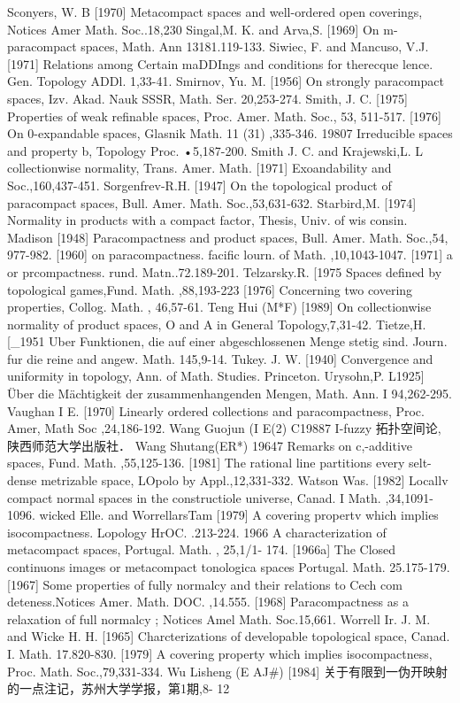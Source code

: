 \documentclass[main.tex]{subfiles}
\begin{document}
{Sconyers, W. B
[1970]
Metacompact spaces and well-ordered open coverings, Notices Amer
Math. Soc..18,230
Singal,M. K. and Arva,S.
[1969]
On m-paracompact spaces, Math. Ann
13181.119-133.
Siwiec, F. and Mancuso, V.J.
[1971]
Relations among
Certain maDDIngs and
conditions for therecque
lence. Gen. Topology ADDl. 1,33-41.
Smirnov, Yu. M.
[1956]
On strongly paracompact spaces, Izv. Akad. Nauk SSSR, Math. Ser.
20,253-274.
Smith, J. C.
[1975] Properties of weak refinable spaces, Proc. Amer. Math. Soc., 53,
511-517.
[1976] On 0-expandable spaces, Glasnik Math. 11 (31) ,335-346.
19807 Irreducible spaces and property b, Topology Proc.
•5,187-200.
Smith J. C. and Krajewski,L. L
collectionwise normality, Trans. Amer. Math.
[1971]
Exoandability and
Soc.,160,437-451.
Sorgenfrev-R.H.
[1947]
On the topological product of paracompact spaces, Bull. Amer. Math.
Soc.,53,631-632.
Starbird,M.
[1974]
Normality in products with a compact factor, Thesis, Univ. of wis
consin. Madison
[1948]
Paracompactness and product spaces, Bull. Amer. Math. Soc.,54,
977-982.
[1960]
on paracompactness. facific lourn.
of Math. ,10,1043-1047.
[1971]
a or prcompactness. rund. Matn..72.189-201.
Telzarsky.R.
[1975 Spaces defined by topological games,Fund. Math. ,88,193-223
[1976]
Concerning two covering properties, Collog. Math. , 46,57-61.
Teng Hui (M*F)
[1989]
On collectionwise normality of product spaces, O and A in General
Topology,7,31-42.
Tietze,H.
[_1951 Uber Funktionen, die auf einer abgeschlossenen Menge stetig sind.
Journ. fur die reine and angew. Math. 145,9-14.
Tukey. J. W.
[1940]
Convergence and uniformity in topology, Ann. of Math. Studies.
Princeton.
Urysohn,P.
L1925] Über die Mächtigkeit der zusammenhangenden Mengen, Math. Ann. I
94,262-295.
Vaughan I E.
[1970] Linearly ordered collections and paracompactness, Proc. Amer, Math
Soc
,24,186-192.
Wang Guojun (I E(2)
	C19887 I-fuzzy 拓扑空间论,陕西师范大学出版社．
	Wang Shutang(ER*)
	19647 Remarks on c,-additive spaces, Fund. Math. ,55,125-136.
	[1981]
	The rational line partitions every selt-dense metrizable space, LOpolo
	by
	Appl.,12,331-332.
	Watson Was.
	[1982]
	Locallv compact normal spaces in the constructiole universe, Canad.
	I Math.
	,34,1091-1096.
	wicked Elle. and WorrellarsTam
	[1979]
	A covering propertv which implies isocompactness. Lopology HrOC.
	.213-224.
	1966 A characterization of metacompact spaces, Portugal. Math. , 25,1/1-
	174.
	[1966a]
	The Closed
	continuons images or metacompact
	tonologica spaces
	Portugal.
	Math. 25.175-179.
	[1967]
	Some properties of fully normalcy and their relations to Cech com
	deteness.Notices Amer. Math.
	DOC. ,14.555.
	[1968]
	Paracompactness as a relaxation of full normalcy
	; Notices Amel
	Math. Soc.15,661.
	Worrell Ir. J. M. and Wicke H. H.
	[1965]
	Charcterizations of developable topological space, Canad.
	I. Math.
	17.820-830.
	[1979]
	A covering property which implies isocompactness, Proc.
	Math. Soc.,79,331-334.
	Wu Lisheng (E AJ#)
	[1984]
	关于有限到一伪开映射的一点注记，苏州大学学报，第1期,8-
	12
	
}
\end{document}
